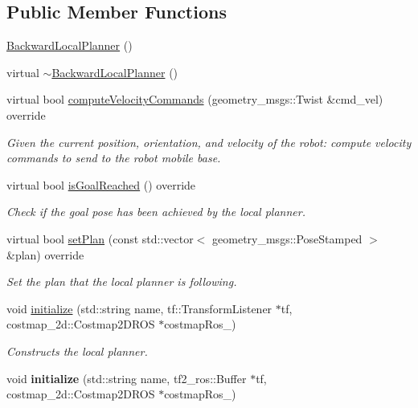 \subsection*{Public Member Functions}
\begin{DoxyCompactItemize}
\item 
\hyperlink{classbackward__local__planner_1_1BackwardLocalPlanner_a54905830515c7e8ffeecdae050ce08d8}{Backward\+Local\+Planner} ()
\item 
virtual \hyperlink{classbackward__local__planner_1_1BackwardLocalPlanner_aab1430f79670f07bf21d0b796539f3e8}{$\sim$\+Backward\+Local\+Planner} ()
\item 
virtual bool \hyperlink{classbackward__local__planner_1_1BackwardLocalPlanner_ad7145b72592b48a21631befcdfbd14f0}{compute\+Velocity\+Commands} (geometry\+\_\+msgs\+::\+Twist \&cmd\+\_\+vel) override
\begin{DoxyCompactList}\small\item\em Given the current position, orientation, and velocity of the robot\+: compute velocity commands to send to the robot mobile base. \end{DoxyCompactList}\item 
virtual bool \hyperlink{classbackward__local__planner_1_1BackwardLocalPlanner_a63beb009f6c230d133ba34b16ce0b189}{is\+Goal\+Reached} () override
\begin{DoxyCompactList}\small\item\em Check if the goal pose has been achieved by the local planner. \end{DoxyCompactList}\item 
virtual bool \hyperlink{classbackward__local__planner_1_1BackwardLocalPlanner_ad2f7c554f1e107a58ac650d377646f27}{set\+Plan} (const std\+::vector$<$ geometry\+\_\+msgs\+::\+Pose\+Stamped $>$ \&plan) override
\begin{DoxyCompactList}\small\item\em Set the plan that the local planner is following. \end{DoxyCompactList}\item 
void \hyperlink{classbackward__local__planner_1_1BackwardLocalPlanner_a2892c597ff24b2b11993011f52df1570}{initialize} (std\+::string name, tf\+::\+Transform\+Listener $\ast$tf, costmap\+\_\+2d\+::\+Costmap2\+D\+R\+OS $\ast$costmap\+Ros\+\_\+)
\begin{DoxyCompactList}\small\item\em Constructs the local planner. \end{DoxyCompactList}\item 
void {\bfseries initialize} (std\+::string name, tf2\+\_\+ros\+::\+Buffer $\ast$tf, costmap\+\_\+2d\+::\+Costmap2\+D\+R\+OS $\ast$costmap\+Ros\+\_\+)\hypertarget{classbackward__local__planner_1_1BackwardLocalPlanner_a548a42d0016ef3a404783aca7169cae7}{}\label{classbackward__local__planner_1_1BackwardLocalPlanner_a548a42d0016ef3a404783aca7169cae7}


\end{DoxyCompactItemize}

